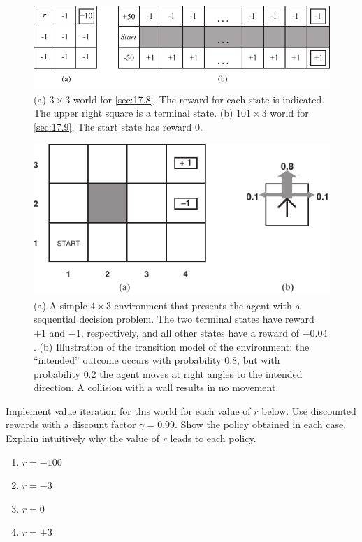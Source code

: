 \documentclass[11pt, a4paper]{article}
\begin{document}
\begin{figure}[h]
    \centering
    \includegraphics{figures/e6_grid_mdp.pdf}
    \caption{(a) $3\times3$ world for \ref{sec:17.8}. The reward for each state is indicated. The upper right square is a terminal state. (b) $101 \times 3$ world for \ref{sec:17.9}. The start state has reward $0$.}
    \label{fig:grid-mdp}
\end{figure}

\begin{figure}[h]
    \centering
    \includegraphics{figures/e6_sequential.pdf}
    \caption{(a) A simple $4\times 3$ environment that presents the agent with a sequential decision problem. The two terminal states have reward $+1$ and $-1$, respectively, and all other states have a reward of $-0.04$. (b) Illustration of the transition model of the environment: the \enquote{intended} outcome occurs with probability $0.8$, but with probability $0.2$ the agent moves at right angles to the intended direction. A collision with a wall results in no movement.}
    \label{fig:sequential}
\end{figure}

Implement value iteration for this world for each value of $r$ below. Use discounted rewards with a discount factor $\gamma = \num{0.99}$. Show
the policy obtained in each case. Explain intuitively why the value of $r$ leads to each policy.

\begin{enumerate}
    \item $r = -100$
    \item $r = -3$
    \item $r = 0$
    \item $r = +3$
\end{enumerate}
\end{document}
